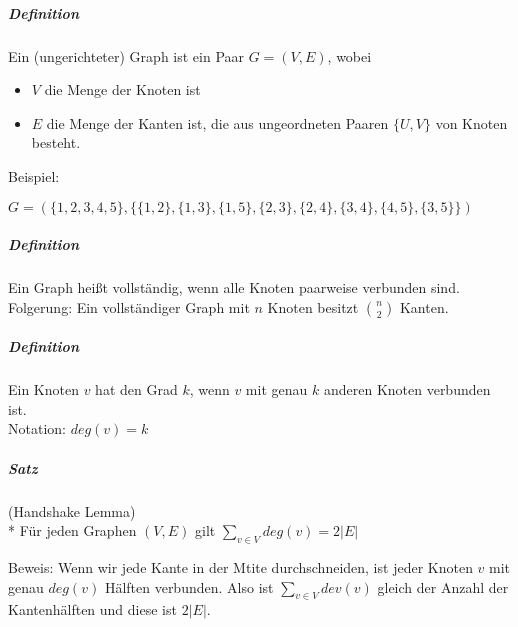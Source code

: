 \documentclass[a4paper]{scrartcl}
\begin{document}
\subparagraph{Definition} Ein (ungerichteter) Graph ist ein Paar $G=(V,E)$, wobei
\begin{itemize}
\item $V$ die Menge der Knoten ist
\item $E$ die Menge der Kanten ist, die aus ungeordneten Paaren $\{U,V\}$ von Knoten besteht.
\end{itemize}

Beispiel:

$G=(\{1,2,3,4,5\},\{\{1,2\},\{1,3\},\{1,5\},\{2,3\},\{2,4\},\{3,4\},\{4,5\},\{3,5\}\})$

\subparagraph{Definition} Ein Graph heißt vollständig, wenn alle Knoten paarweise verbunden sind.\\
Folgerung: Ein vollständiger Graph mit $n$ Knoten besitzt $\binom{n}{2}$ Kanten.

\subparagraph{Definition} Ein Knoten $v$ hat den Grad $k$, wenn $v$ mit genau $k$ anderen Knoten verbunden ist.\\
Notation: $deg(v)=k$



\subparagraph{Satz} (Handshake Lemma)\\*
Für jeden Graphen $(V,E)$ gilt $\sum\limits_{v\in V} deg(v)=2\lvert E\rvert$

Beweis: Wenn wir jede Kante in der Mtite durchschneiden, ist jeder Knoten $v$ mit genau $deg(v)$ Hälften verbunden. Also ist $\sum\limits_{v\in V} dev(v)$ gleich der Anzahl der Kantenhälften und diese ist $2\lvert E \rvert$.
\end{document}
